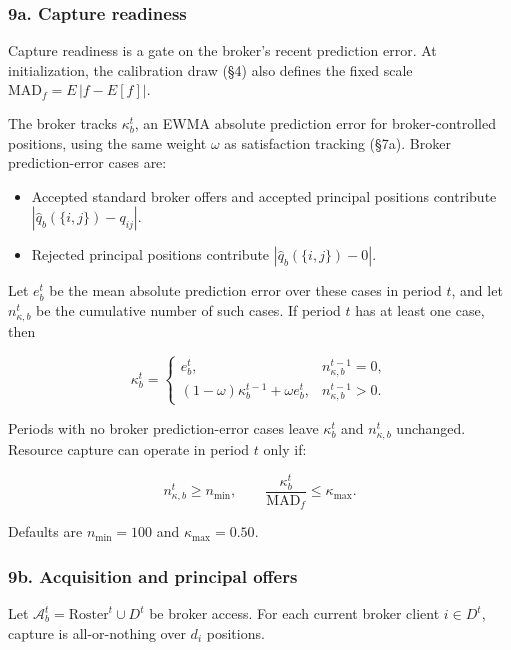 \documentclass[11pt]{article}
\providecommand{\tightlist}{%
  \setlength{\itemsep}{0pt}\setlength{\parskip}{0pt}}
\begin{document}
\subsubsection{9a. Capture readiness}\label{a.-capture-readiness}

Capture readiness is a gate on the broker's recent prediction error. At initialization, the calibration draw (§4) also defines the fixed scale \(\mathrm{MAD}_f = E\,|f - E[f]|\).

The broker tracks \(\kappa_b^t\), an EWMA absolute prediction error for broker-controlled positions, using the same weight \(\omega\) as satisfaction tracking (§7a). Broker prediction-error cases are:

\begin{itemize}
\tightlist
\item
  Accepted standard broker offers and accepted principal positions contribute \(|\hat{q}_b(\{i,j\}) - q_{ij}|\).
\item
  Rejected principal positions contribute \(|\hat{q}_b(\{i,j\}) - 0|\).
\end{itemize}

Let \(e_b^t\) be the mean absolute prediction error over these cases in period \(t\), and let \(n_{\kappa,b}^t\) be the cumulative number of such cases. If period \(t\) has at least one case, then

\[
\kappa_b^t =
\begin{cases}
e_b^t, & n_{\kappa,b}^{t-1}=0,\\
(1-\omega)\kappa_b^{t-1}+\omega e_b^t, & n_{\kappa,b}^{t-1}>0.
\end{cases}
\]

Periods with no broker prediction-error cases leave \(\kappa_b^t\) and \(n_{\kappa,b}^t\) unchanged. Resource capture can operate in period \(t\) only if:

\[
n_{\kappa,b}^t \geq n_{\min}, \qquad
\frac{\kappa_b^t}{\mathrm{MAD}_f} \leq \kappa_{\max} .
\]

Defaults are \(n_{\min} = 100\) and \(\kappa_{\max} = 0.50\).

\subsubsection{9b. Acquisition and principal offers}\label{b.-acquisition-and-principal-offers}

Let \(\mathcal{A}_b^t = \text{Roster}^t \cup D^t\) be broker access. For each current broker client \(i \in D^t\), capture is all-or-nothing over \(d_i\) positions.
\end{document}
